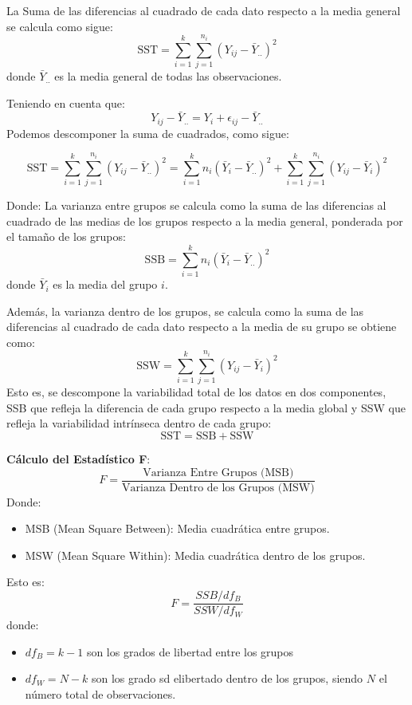 \documentclass[
  letterpaper,
  DIV=11,
  numbers=noendperiod]{scrreprt}
\providecommand{\tightlist}{%
  \setlength{\itemsep}{0pt}\setlength{\parskip}{0pt}}\usepackage{longtable,booktabs,array}
\begin{document}
La Suma de las diferencias al cuadrado de cada dato respecto a la media
general se calcula como sigue: \[
    \text{SST} = \sum_{i=1}^{k} \sum_{j=1}^{n_i} (Y_{ij} - \bar{Y}_{..})^2        
\] donde \(\bar{Y}_{..}\) es la media general de todas las
observaciones.

Teniendo en cuenta que: \[
Y_{ij} - \bar{Y}_{..}= Y_i  + \epsilon_{ij} - \bar{Y}_{..} 
\] Podemos descomponer la suma de cuadrados, como sigue:

\[
    \text{SST} = \sum_{i=1}^{k} \sum_{j=1}^{n_i} (Y_{ij} - \bar{Y}_{..})^2=  \sum_{i=1}^{k} n_i (\bar{Y}_i - \bar{Y}_{..})^2+\sum_{i=1}^{k} \sum_{j=1}^{n_i} (Y_{ij} - \bar{Y}_i)^2      
\]

Donde: La varianza entre grupos se calcula como la suma de las
diferencias al cuadrado de las medias de los grupos respecto a la media
general, ponderada por el tamaño de los grupos: \[
\text{SSB} = \sum_{i=1}^{k} n_i (\bar{Y}_i - \bar{Y}_{..})^2
\] donde \(\bar{Y}_i\) es la media del grupo \(i\).

Además, la varianza dentro de los grupos, se calcula como la suma de las
diferencias al cuadrado de cada dato respecto a la media de su grupo se
obtiene como: \[
\text{SSW} = \sum_{i=1}^{k} \sum_{j=1}^{n_i} (Y_{ij} - \bar{Y}_i)^2
\] Esto es, se descompone la variabilidad total de los datos en dos
componentes, SSB que refleja la diferencia de cada grupo respecto a la
media global y SSW que refleja la variabilidad intrínseca dentro de cada
grupo: \[
\text{SST} = \text{SSB} + \text{SSW}
\]

\textbf{Cálculo del Estadístico F}: \[
F = \frac{\text{Varianza Entre Grupos (MSB)}}{\text{Varianza Dentro de los Grupos (MSW)}}
\] Donde:

\begin{itemize}
\tightlist
\item
  MSB (Mean Square Between): Media cuadrática entre grupos.
\item
  MSW (Mean Square Within): Media cuadrática dentro de los grupos.
\end{itemize}

Esto es: \[
F=\frac{SSB/df_B}{SSW/df_W}
\] donde:

\begin{itemize}
\tightlist
\item
  \(df_B=k-1\) son los grados de libertad entre los grupos
\item
  \(df_W=N-k\) son los grado sd elibertado dentro de los grupos, siendo
  \(N\) el número total de observaciones.
\end{itemize}
\end{document}
